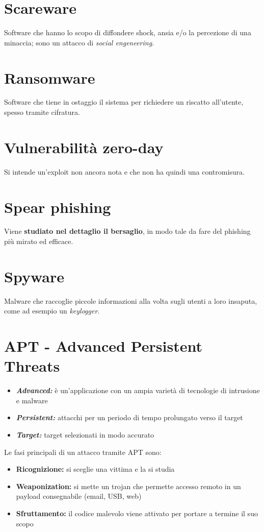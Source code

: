 \section{Scareware}
Software che hanno lo scopo di diffondere shock, ansia e/o la percezione di una minaccia; sono 
un attacco di \textit{social engeneering}.

\section{Ransomware}
Software che tiene in ostaggio il sistema per richiedere un riscatto all'utente, spesso tramite
cifratura.

\section{Vulnerabilità zero-day}
Si intende un'exploit non ancora nota e che non ha quindi una contromisura.

\section{Spear phishing}
Viene \textbf{studiato nel dettaglio il bersaglio}, in modo tale da fare del phishing più mirato 
ed efficace.

\section{Spyware}
Malware che raccoglie piccole informazioni alla volta sugli utenti a loro insaputa,
come ad esempio un \textit{keylogger}.

\section{APT - Advanced Persistent Threats}
\begin{itemize}
    \item \textit{\textbf{Advanced:}} è un'applicazione con un ampia varietà di tecnologie di intrusione e malware
    \item \textit{\textbf{Persistent:}}
    attacchi per un periodo di tempo prolungato verso il target
    \item \textit{\textbf{Target:}} target selezionati in modo accurato
\end{itemize}

\noindent Le fasi principali di un attacco tramite APT sono:
\begin{itemize}
    \item \textbf{Ricognizione:} si sceglie una vittima e la si studia 
    \item \textbf{Weaponization:} si mette un trojan che permette accesso remoto in un payload consegnabile (email, USB, web)
    \item \textbf{Sfruttamento:} il codice malevolo viene attivato per portare a termine il suo scopo
\end{itemize}



